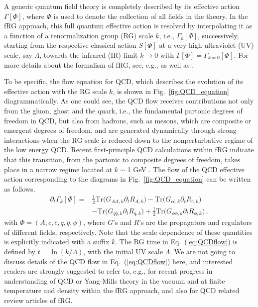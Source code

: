 \documentclass[%
reprint,
superscriptaddress,
showpacs,preprintnumbers,
 amsmath,amssymb,
 aps,
prd,
]{revtex4-1}
\def\Fig#1{Fig.~\ref{#1}} \def\Tab#1{Tab.~\ref{#1}}
\def\Eq#1{Eq.~(\ref{#1})}
\begin{document}
A generic quantum field theory is completely described by its effective action $\Gamma[\Phi]$, where $\Phi$ is used to denote the collection of all fields in the theory. In the fRG approach, this full quantum effective action is resolved by  
interpolating it as a function of a renormalization group (RG) scale $k$, i.e., $\Gamma_k[\Phi]$, successively, starting from the respective classical action $S[\Phi]$ at a very high ultraviolet (UV) scale, say $\Lambda$, towards the infrared (IR) limit $k\rightarrow 0$ with $\Gamma[\Phi]=\Gamma_{k=0}[\Phi]$. For more details about the formalism of fRG, see, e.g., \cite{Wetterich:1992yh} as well as \cite{Ellwanger:1993mw,Morris:1993qb}. 

To be specific, the flow equation for QCD, which describes the evolution of its effective action with the RG scale $k$, is shown in \Fig{fig:QCD_equation} diagrammatically. As one could see, the QCD flow receives contributions not only from the  gluon, ghost and the quark, i.e., the fundamental partonic degrees of freedom in QCD, but also from hadrons, such as mesons, which are composite or emergent degrees of freedom, and are generated dynamically through strong interactions when the RG scale is reduced down to the nonperturbative regime of the low energy QCD. Recent first-principle QCD calculations within fRG indicate that this transition, from the partonic to composite degrees of freedom, takes place in a narrow regime located at $k\sim$1 GeV \cite{Mitter:2014wpa,Braun:2014ata,Cyrol:2017ewj,Fu:2019hdw}. The flow of the QCD effective action corresponding to the diagrams in \Fig{fig:QCD_equation} can be written as follows,
%
\begin{align}
\partial_t\Gamma_k[\Phi]=&\frac{1}{2}\mathrm{Tr}\Big(G_{AA,k}\partial_t R_{A,k}\Big)-\mathrm{Tr}\Big(G_{c\bar c,k}\partial_t R_{c,k}\Big)\nonumber\\[2ex]
  &-\mathrm{Tr}\Big(G_{q\bar q,k}\partial_t R_{q,k}\Big)+\frac{1}{2}\mathrm{Tr}\Big(G_{\phi\phi,k}\partial_t R_{\phi,k}\Big)\,,\label{eq:QCDflow}
\end{align}
%
with $\Phi=(A, c, \bar c, q,\bar q,\phi)$, where $G$'s and $R$'s are the propagators and regulators of different fields, respectively. Note that the scale dependence of these quantities is explicitly indicated with a suffix $k$. The RG time in \Eq{eq:QCDflow} is defined by $t=\ln(k/\Lambda)$, with the initial UV scale $\Lambda$. We are not going to discuss details of the QCD flow in \Eq{eq:QCDflow} here, and interested readers are strongly suggested to refer to, e.g.,  \cite{Braun:2007bx,Braun:2008pi,Braun:2009gm,Mitter:2014wpa,Braun:2014ata,Cyrol:2016tym,Cyrol:2017ewj,Cyrol:2017qkl,Fu:2019hdw,Braun:2020ada} for recent progress in understanding of QCD or Yang-Mills theory in the vacuum and at finite temperature and density within the fRG approach, and also \cite{Berges:2000ew,Pawlowski:2005xe,Schaefer:2006sr,Gies:2006wv,Rosten:2010vm,Braun:2011pp,Pawlowski:2014aha,Dupuis:2020fhh} for QCD related review articles of fRG.
\end{document}
